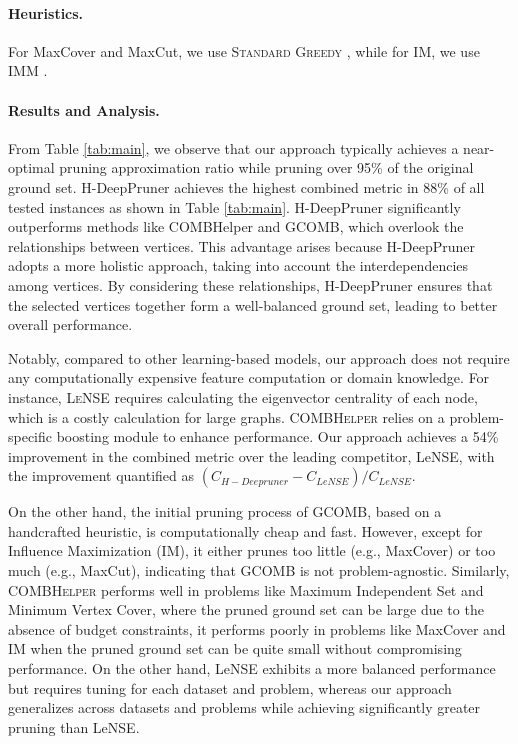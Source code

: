 \documentclass[letterpaper]{article} %
\begin{document}
\paragraph{Heuristics.} For MaxCover and MaxCut, we use \textsc{Standard Greedy} \cite{nemhauser1978analysis}, while for IM, we use IMM \cite{tang2015influence}.



\paragraph{Results and Analysis.} From Table \ref{tab:main}, we observe that our approach typically achieves a near-optimal pruning approximation ratio while pruning over 95\% of the original ground set. H-DeepPruner achieves the highest combined metric in 88\% of all tested instances as shown in Table \ref{tab:main}. H-DeepPruner significantly outperforms methods like COMBHelper and GCOMB, which overlook the relationships between vertices. This advantage arises because H-DeepPruner adopts a more holistic approach, taking into account the interdependencies among vertices. By considering these relationships, H-DeepPruner ensures that the selected vertices together form a well-balanced ground set, leading to better overall performance.

Notably, compared to other learning-based models, our approach does not require any computationally expensive feature computation or domain knowledge. For instance, \textsc{LeNSE} requires calculating the eigenvector centrality of each node, which is a costly calculation for large graphs. \textsc{COMBHelper} relies on a problem-specific boosting module to enhance performance. Our approach achieves a 54\% improvement in the combined metric over the leading competitor, LeNSE, with the improvement quantified as \((C_{H-Deepruner} - C_{LeNSE}) / C_{LeNSE}\).




On the other hand, the initial pruning process of GCOMB, based on a handcrafted heuristic, is computationally cheap and fast. However, except for Influence Maximization (IM), it either prunes too little (e.g., MaxCover) or too much (e.g., MaxCut), indicating that GCOMB is not problem-agnostic. Similarly, \textsc{COMBHelper} performs well in problems like Maximum Independent Set and Minimum Vertex Cover, where the pruned ground set can be large due to the absence of budget constraints, it performs poorly in problems like MaxCover and IM when the pruned ground set can be quite small without compromising performance. On the other hand, LeNSE exhibits a more balanced performance but requires tuning for each dataset and problem, whereas our approach generalizes across datasets and problems while achieving significantly greater pruning than LeNSE.
\end{document}
